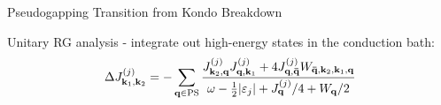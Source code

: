 \documentclass[10pt,aspectratio=169]{beamer}
\begin{document}
\begin{frame}{Pseudogapping Transition from Kondo Breakdown}
\begin{minipage}{0.48\textwidth}
Unitary RG analysis - integrate out high-energy states in the conduction bath:
\[\Delta J^{(j)}_{{\bf k}_1, {\bf k}_2} = -\sum_{{\bf q} \in \text{PS}} \frac{J^{(j)}_{{\bf k}_2,{\bf q}} J^{(j)}_{{\bf q},{\bf k}_1} + 4J^{(j)}_{{\bf q}, {\bf \bar q}} W_{{\bf \bar q}, {\bf k}_2, {\bf k}_1, {\bf q}}}{\omega - \frac{1}{2}|\varepsilon_j| + J^{(j)}_{{\bf q}}/4 + W_{{\bf q}}/2}\]
\end{minipage}
\begin{minipage}{0.48\textwidth}
	\begin{itemize}
	\end{itemize}
\end{minipage}
	
\begin{center}
\end{center}
\end{frame}
\end{document}
